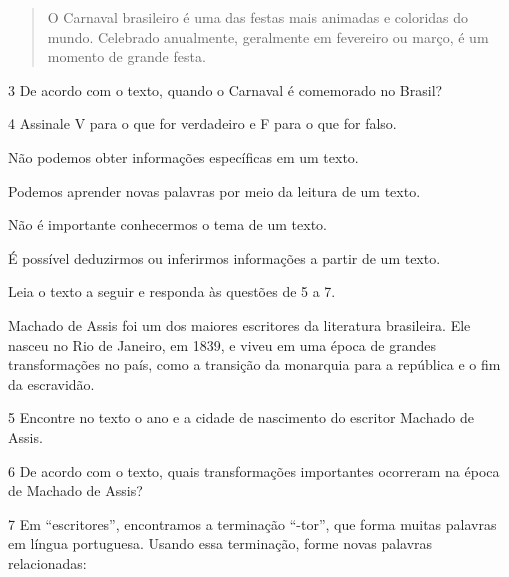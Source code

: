 \begin{quote}
O Carnaval brasileiro é uma das festas mais animadas e coloridas do
mundo. Celebrado anualmente, geralmente em fevereiro ou março, é um
momento de grande festa.

\end{quote}



\num{3} De acordo com o texto, quando o Carnaval é comemorado no Brasil?


\num{4} Assinale V para o que for verdadeiro e F para o que for falso.

\begin{boxlist}
 Não podemos obter informações específicas em um texto.

 Podemos aprender novas palavras por meio da leitura de um texto.

 Não é importante conhecermos o tema de um texto.

 É possível deduzirmos ou inferirmos informações a partir de um texto.
\end{boxlist}

Leia o texto a seguir e responda às questões de 5 a 7.

\begin{myquote}
Machado de Assis foi um dos maiores escritores da literatura
brasileira. Ele nasceu no Rio de Janeiro, em 1839, e viveu em uma época
de grandes transformações no país, como a transição da monarquia para a
república e o fim da escravidão.

\end{myquote}

\num{5} Encontre no texto o ano e a cidade de nascimento do escritor Machado de Assis.


\num{6} De acordo com o texto, quais transformações importantes ocorreram na época de Machado de Assis?


\num{7} Em “escritores”, encontramos a terminação “-tor”, que forma muitas palavras em língua portuguesa. Usando essa terminação, forme novas palavras relacionadas:

